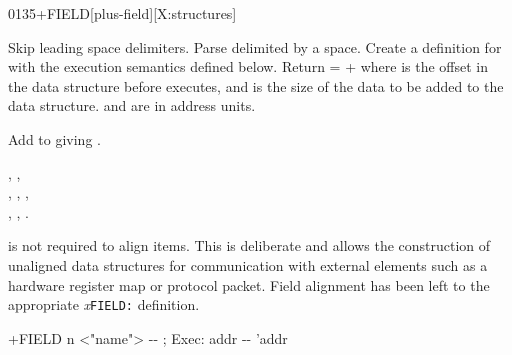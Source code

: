 
\begin{worddef}{0135}{+FIELD}[plus-field][X:structures]
\item {}

	Skip leading space delimiters.  Parse  delimited
	by a space.  Create a definition for  with the
	execution semantics defined below.  Return  =
	 +  where  is the offset
	in the data structure before  executes, and
	 is the size of the data to be added to the data
	structure.  and  are in address units.

\execute[name]

	Add  to  giving .

\see {},
	, \\
	,
	,
	, \\
	,
	,
	.

	\begin{rationale} %
		 is not required to align items.  This is
		deliberate and allows the construction of unaligned data
		structures for communication with external elements such
		as a hardware register map or protocol packet.
		Field alignment has been left to the appropriate
		\emph{x}\texttt{FIELD:} definition.
	\end{rationale}

	\begin{implement} %

		\word{:} +FIELD\tab{} n <"name"> -{}- ; Exec: addr -{}- 'addr \\
		\tab {}  \word{,} \word{+} \\
		\tab {}  \word{+} \\
		\word{;}
	\end{implement}
\end{worddef}


